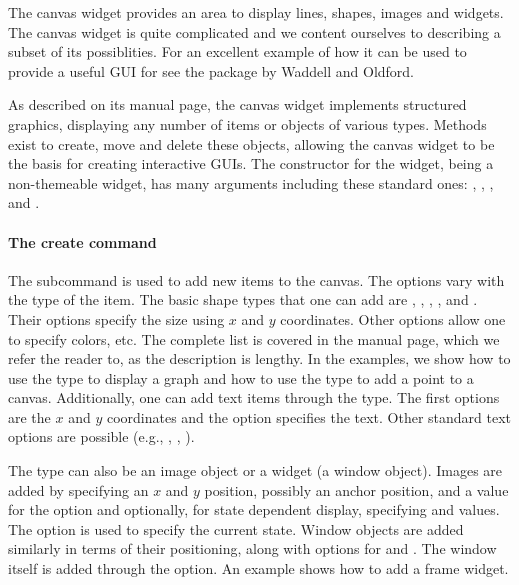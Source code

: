  
The canvas widget provides an area to display lines, shapes, images
and widgets. The canvas widget is quite complicated and we content
ourselves to describing a subset of its possiblities. For an excellent
example of how it can be used to provide a useful GUI for \R{} see the
 package by Waddell and Oldford.


As described on its manual page, the canvas widget implements
structured graphics, displaying any number of items or objects of
various types.  Methods exist to create, move and delete these
objects, allowing the canvas widget to be the basis for creating
interactive GUIs. The constructor  for the
widget, being a non-themeable widget, has many arguments including
these standard ones: ,
, ,
 and
.


\paragraph{The create command}
The subcommand  is used
to add new items to the canvas. The options vary with the type of the
item. The basic shape types that one can add are ,
, , , and
. Their options specify the size using $x$ and $y$
coordinates. Other options allow one to specify colors, etc. The
complete list is covered in the  manual page, which we
refer the reader to, as the description is lengthy.  In the examples,
we show how to use the  type to display a graph and how to
use the  type to add a point to a canvas. Additionally,
one can add text items through the  type. The first
options are the $x$ and $y$ coordinates and the  option
specifies the text.  Other standard text options are possible (e.g.,
, , ).

The type can also be an image object or a widget (a window
object). Images are added by specifying an $x$ and $y$ position,
possibly an anchor position, and a value for the  option
and optionally, for state dependent display, specifying
 and  values. The
 option is used to specify the current state. Window
objects are added similarly in terms of their positioning, along with
options for  and . The window itself is
added through the  option. An example shows how to add a
frame widget.

